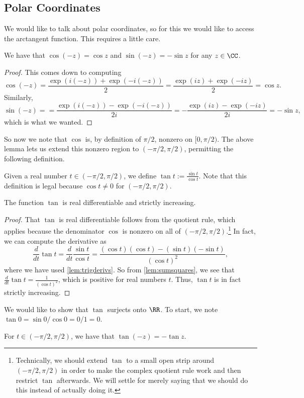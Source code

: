 \subsection{Polar Coordinates}
We would like to talk about polar coordinates, so for this we would like to access the arctangent function. This requires a little care.
\begin{lemma} \label{lem:negtrig}
	We have that $\cos(-z)=\cos z$ and $\sin(-z)=-\sin z$ for any $z\in\CC$.
\end{lemma}
\begin{proof}
	This comes down to computing
	\[\cos(-z)=\frac{\exp(i(-z))+\exp(-i(-z))}2=\frac{\exp(iz)+\exp(-iz)}2=\cos z.\]
	Similarly,
	\[\sin(-z)==\frac{\exp(i(-z))-\exp(-i(-z))}{2i}=-\frac{\exp(iz)-\exp(-iz)}{2i}=-\sin z,\]
	which is what we wanted.
\end{proof}
So now we note that $\cos$ is, by definition of $\pi/2$, nonzero on $[0,\pi/2)$. The above lemma lets us extend this nonzero region to $(-\pi/2,\pi/2)$, permitting the following definition.
\begin{definition}
	Given a real number $t\in(-\pi/2,\pi/2)$, we define $\tan t:=\frac{\sin t}{\cos t}$. Note that this definition is legal because $\cos t\ne0$ for $(-\pi/2,\pi/2)$.
\end{definition}
\begin{lemma} \label{lem:basictan}
	The function $\tan$ is real differentiable and strictly increasing.
\end{lemma}
\begin{proof}
	That $\tan$ is real differentiable follows from the quotient rule, which applies because the denominator $\cos$ is nonzero on all of $(-\pi/2,\pi/2)$.\footnote{Technically, we should extend $\tan$ to a small open strip around $(-\pi/2,\pi/2)$ in order to make the complex quotient rule work and then restrict $\tan$ afterwards. We will settle for merely saying that we should do this instead of actually doing it.} In fact, we can compute the derivative as
	\[\frac d{dt}\tan t=\frac d{dt}\frac{\sin t}{\cos t}=\frac{(\cos t)(\cos t)-(\sin t)(-\sin t)}{(\cos t)^2},\]
	where we have used \autoref{lem:trigderivs}. So from \autoref{lem:sumsquares}, we see that $\frac d{dt}\tan t=\frac1{(\cos t)^2}$, which is positive for real numbers $t$. Thus, $\tan t$ is in fact strictly increasing.
\end{proof}
We would like to show that $\tan$ surjects onto $\RR$. To start, we note $\tan0=\sin0/\cos0=0/1=0$.
\begin{lemma} \label{lem:negtan}
	For $t\in(-\pi/2,\pi/2)$, we have that $\tan(-z)=-\tan z$.
\end{lemma}
